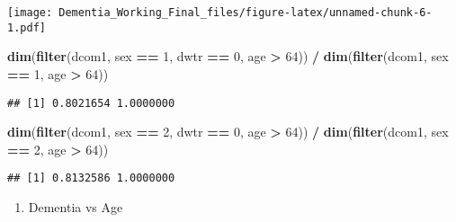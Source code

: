 \documentclass[]{article}
\newenvironment{Shaded}{\begin{snugshade}}{\end{snugshade}}
\newcommand{\DecValTok}[1]{\textcolor[rgb]{0.00,0.00,0.81}{#1}}
\newcommand{\KeywordTok}[1]{\textcolor[rgb]{0.13,0.29,0.53}{\textbf{#1}}}
\newcommand{\NormalTok}[1]{#1}
\newcommand{\OperatorTok}[1]{\textcolor[rgb]{0.81,0.36,0.00}{\textbf{#1}}}
\newcommand{\StringTok}[1]{\textcolor[rgb]{0.31,0.60,0.02}{#1}}
\providecommand{\tightlist}{%
  \setlength{\itemsep}{0pt}\setlength{\parskip}{0pt}}
\begin{document}
\texttt{[image: Dementia\_Working\_Final\_files/figure-latex/unnamed-chunk-6-1.pdf]}

\begin{Shaded}
\begin{Highlighting}[]
\KeywordTok{dim}\NormalTok{(}\KeywordTok{filter}\NormalTok{(dcom1, sex }\OperatorTok{==}\StringTok{ }\DecValTok{1}\NormalTok{, dwtr }\OperatorTok{==}\StringTok{ }\DecValTok{0}\NormalTok{, age }\OperatorTok{>}\StringTok{ }\DecValTok{64}\NormalTok{)) }\OperatorTok{/}\StringTok{ }\KeywordTok{dim}\NormalTok{(}\KeywordTok{filter}\NormalTok{(dcom1, sex }\OperatorTok{==}\StringTok{ }\DecValTok{1}\NormalTok{, age }\OperatorTok{>}\StringTok{ }\DecValTok{64}\NormalTok{))}
\end{Highlighting}
\end{Shaded}

\begin{verbatim}
## [1] 0.8021654 1.0000000
\end{verbatim}

\begin{Shaded}
\begin{Highlighting}[]
\KeywordTok{dim}\NormalTok{(}\KeywordTok{filter}\NormalTok{(dcom1, sex }\OperatorTok{==}\StringTok{ }\DecValTok{2}\NormalTok{, dwtr }\OperatorTok{==}\StringTok{ }\DecValTok{0}\NormalTok{, age }\OperatorTok{>}\StringTok{ }\DecValTok{64}\NormalTok{)) }\OperatorTok{/}\StringTok{ }\KeywordTok{dim}\NormalTok{(}\KeywordTok{filter}\NormalTok{(dcom1, sex }\OperatorTok{==}\StringTok{ }\DecValTok{2}\NormalTok{, age }\OperatorTok{>}\StringTok{ }\DecValTok{64}\NormalTok{))}
\end{Highlighting}
\end{Shaded}

\begin{verbatim}
## [1] 0.8132586 1.0000000
\end{verbatim}

\begin{enumerate}
\def\labelenumi{\alph{enumi}.}
\setcounter{enumi}{1}
\tightlist
\item
  Dementia vs Age
\end{enumerate}
\end{document}

